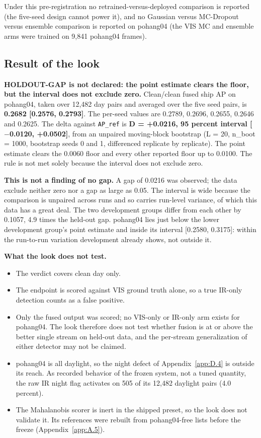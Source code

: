 \documentclass[10pt]{article}
\begin{document}
Under this pre-registration no retrained-versus-deployed comparison is reported (the five-seed design cannot power it), and no Gaussian versus MC-Dropout versus ensemble comparison is reported on pohang04 (the VIS MC and ensemble arms were trained on 9,841 pohang04 frames).

\subsection{Result of the look}\label{app:G.2}
\textbf{HOLDOUT-GAP is not declared: the point estimate clears the floor, but the interval does not exclude zero.} Clean/clean fused ship AP on pohang04, taken over 12,482 day pairs and averaged over the five seed pairs, is \textbf{0.2682 [0.2576, 0.2793]}. The per-seed values are 0.2789, 0.2696, 0.2655, 0.2646 and 0.2625. The delta against \texttt{AP\_\allowbreak{}ref} is \textbf{D = +0.0216, 95 percent interval [$-$0.0120, +0.0502]}, from an unpaired moving-block bootstrap (L = 20, n\_boot = 1000, bootstrap seeds 0 and 1, differenced replicate by replicate). The point estimate clears the 0.0060 floor and every other reported floor up to 0.0100. The rule is not met solely because the interval does not exclude zero.

\textbf{This is not a finding of no gap.} A gap of 0.0216 was observed; the data exclude neither zero nor a gap as large as 0.05. The interval is wide because the comparison is unpaired across runs and so carries run-level variance, of which this data has a great deal. The two development groups differ from each other by 0.1057, 4.9 times the held-out gap. pohang04 lies just below the lower development group's point estimate and inside its interval [0.2580, 0.3175]: within the run-to-run variation development already shows, not outside it.

\textbf{What the look does not test.}
\begin{itemize}
\item The verdict covers clean day only.
\item The endpoint is scored against VIS ground truth alone, so a true IR-only detection counts as a false positive.
\item Only the fused output was scored; no VIS-only or IR-only arm exists for pohang04. The look therefore does not test whether fusion is at or above the better single stream on held-out data, and the per-stream generalization of either detector may not be claimed.
\item pohang04 is all daylight, so the night defect of Appendix~\ref{app:D.4} is outside its reach. As recorded behavior of the frozen system, not a tuned quantity, the raw IR night flag activates on 505 of its 12,482 daylight pairs (4.0 percent).
\item The Mahalanobis scorer is inert in the shipped preset, so the look does not validate it. Its references were rebuilt from pohang04-free lists before the freeze (Appendix~\ref{app:A.5}).
\end{itemize}
\end{document}
